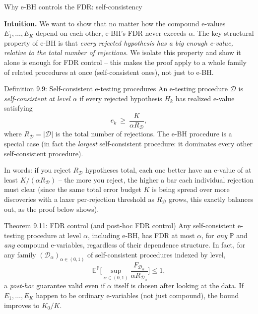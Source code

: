 \documentclass[aspectratio=169,10pt]{beamer}
\begin{document}
\begin{frame}[allowframebreaks]{Why e-BH controls the FDR: self-consistency}

\textbf{Intuition.} We want to show that no matter how the compound e-values $E_1,\dots,E_K$ depend on each other, e-BH's FDR never exceeds $\alpha$. The key structural property of e-BH is that \emph{every rejected hypothesis has a big enough e-value, relative to the total number of rejections}. We isolate this property and show it alone is enough for FDR control -- this makes the proof apply to a whole family of related procedures at once (self-consistent ones), not just to e-BH.

\begin{block}{Definition 9.9: Self-consistent e-testing procedures}
An e-testing procedure $\mathcal{D}$ is \emph{self-consistent at level $\alpha$} if every rejected hypothesis $H_k$ has realized e-value satisfying
\[
e_k \ \ge\ \frac{K}{\alpha R_{\mathcal{D}}},
\]
where $R_\mathcal{D}=|\mathcal{D}|$ is the total number of rejections. The e-BH procedure is a special case (in fact the \emph{largest} self-consistent procedure: it dominates every other self-consistent procedure).
\end{block}
In words: if you reject $R_\mathcal{D}$ hypotheses total, each one better have an e-value of at least $K/(\alpha R_\mathcal{D})$ -- the more you reject, the higher a bar each individual rejection must clear (since the same total error budget $K$ is being spread over more discoveries with a laxer per-rejection threshold as $R_\mathcal D$ grows, this exactly balances out, as the proof below shows).

\framebreak

\begin{block}{Theorem 9.11: FDR control (and post-hoc FDR control)}
Any self-consistent e-testing procedure at level $\alpha$, including e-BH, has FDR at most $\alpha$, for \emph{any} $\mathbb{P}$ and \emph{any} compound e-variables, regardless of their dependence structure. In fact, for any family $(\mathcal{D}_\alpha)_{\alpha\in(0,1)}$ of self-consistent procedures indexed by level,
\[
\mathbb{E}^{\mathbb{P}}\Big[\sup_{\alpha\in(0,1)} \frac{F_{\mathcal{D}_\alpha}}{\alpha R_{\mathcal{D}_\alpha}}\Big] \le 1,
\]
a \emph{post-hoc} guarantee valid even if $\alpha$ itself is chosen after looking at the data. If $E_1,\dots,E_K$ happen to be ordinary e-variables (not just compound), the bound improves to $K_0/K$.
\end{block}


\end{frame}
\end{document}
